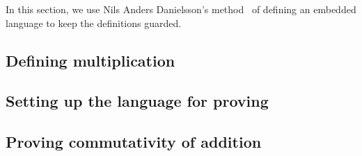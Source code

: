 In this section, we use Nils Anders Danielsson's
method~\cite{danielsson-beating} of defining an embedded language to keep the
definitions guarded.

\subsection{Defining multiplication}


\subsection{Setting up the language for proving}


\subsection{Proving commutativity of addition}

